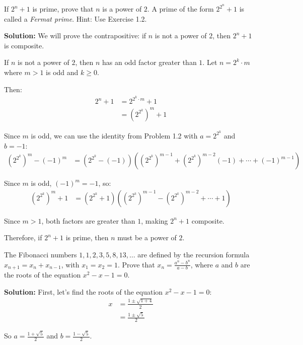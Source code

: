 \begin{problembox}
If $2^n + 1$ is prime, prove that $n$ is a power of $2$. A prime of the form $2^{2^n} + 1$ is called a \textit{Fermat prime}. Hint: Use Exercise 1.2.
\end{problembox}

\textbf{Solution:}
We will prove the contrapositive: if $n$ is not a power of $2$, then $2^n + 1$ is composite.

If $n$ is not a power of $2$, then $n$ has an odd factor greater than $1$. Let $n = 2^k \cdot m$ where $m > 1$ is odd and $k \geq 0$.

Then:
\begin{align*}
2^n + 1 &= 2^{2^k \cdot m} + 1 \\
&= (2^{2^k})^m + 1
\end{align*}

Since $m$ is odd, we can use the identity from Problem 1.2 with $a = 2^{2^k}$ and $b = -1$:
\begin{align*}
(2^{2^k})^m - (-1)^m &= (2^{2^k} - (-1))((2^{2^k})^{m-1} + (2^{2^k})^{m-2}(-1) + \cdots + (-1)^{m-1})
\end{align*}

Since $m$ is odd, $(-1)^m = -1$, so:
\begin{align*}
(2^{2^k})^m + 1 &= (2^{2^k} + 1)((2^{2^k})^{m-1} - (2^{2^k})^{m-2} + \cdots + 1)
\end{align*}

Since $m > 1$, both factors are greater than $1$, making $2^n + 1$ composite.

Therefore, if $2^n + 1$ is prime, then $n$ must be a power of $2$.

\begin{problembox}
The Fibonacci numbers $1, 1, 2, 3, 5, 8, 13, \dots$ are defined by the recursion formula $x_{n+1} = x_n + x_{n-1}$, with $x_1 = x_2 = 1$. Prove that $x_n = \frac{a^n - b^n}{a - b}$, where $a$ and $b$ are the roots of the equation $x^2 - x - 1 = 0$.
\end{problembox}

\textbf{Solution:}
First, let's find the roots of the equation $x^2 - x - 1 = 0$:
\begin{align*}
x &= \frac{1 \pm \sqrt{1 + 4}}{2} \\
&= \frac{1 \pm \sqrt{5}}{2}
\end{align*}

So $a = \frac{1 + \sqrt{5}}{2}$ and $b = \frac{1 - \sqrt{5}}{2}$.

